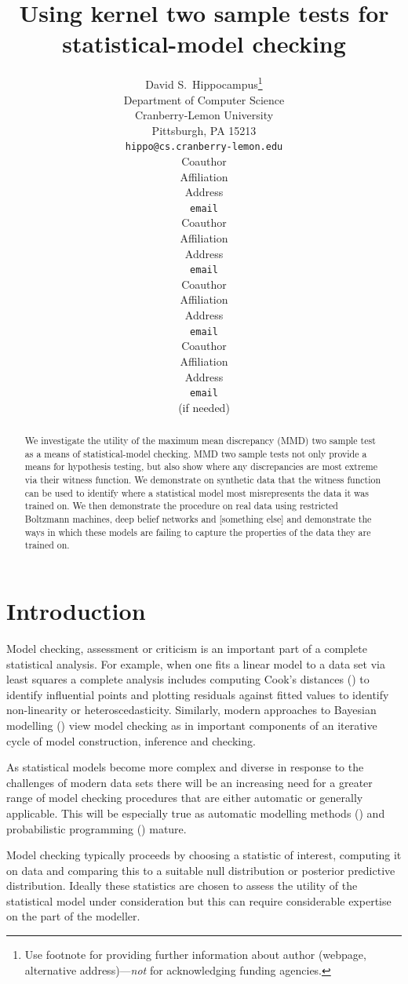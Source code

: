 \documentclass{article} %
\title{Using kernel two sample tests for\\statistical-model checking}
\author{
David S.~Hippocampus\thanks{ Use footnote for providing further information
about author (webpage, alternative address)---\emph{not} for acknowledging
funding agencies.} \\
Department of Computer Science\\
Cranberry-Lemon University\\
Pittsburgh, PA 15213 \\
\texttt{hippo@cs.cranberry-lemon.edu} \\
\And
Coauthor \\
Affiliation \\
Address \\
\texttt{email} \\
\AND
Coauthor \\
Affiliation \\
Address \\
\texttt{email} \\
\And
Coauthor \\
Affiliation \\
Address \\
\texttt{email} \\
\And
Coauthor \\
Affiliation \\
Address \\
\texttt{email} \\
(if needed)\\
}
\begin{document}
 

\maketitle

\begin{abstract} 
We investigate the utility of the maximum mean discrepancy (MMD) two sample test as a means of statistical-model checking.
MMD two sample tests not only provide a means for hypothesis testing, but also show where any discrepancies are most extreme via their witness function.
We demonstrate on synthetic data that the witness function can be used to identify where a statistical model most misrepresents the data it was trained on.
We then demonstrate the procedure on real data using restricted Boltzmann machines, deep belief networks and [something else] and demonstrate the ways in which these models are failing to capture the properties of the data they are trained on.
\end{abstract} 

\allowdisplaybreaks

\section{Introduction}

Model checking, assessment or criticism is an important part of a complete statistical analysis.
For example, when one fits a linear model to a data set via least squares a complete analysis includes computing Cook's distances () to identify influential points and plotting residuals against fitted values to identify non-linearity or heteroscedasticity.
Similarly, modern approaches to Bayesian modelling () view model checking as in important components of an iterative cycle of model construction, inference and checking.

As statistical models become more complex and diverse in response to the challenges of modern data sets there will be an increasing need for a greater range of model checking procedures that are either automatic or generally applicable.
This will be especially true as automatic modelling methods () and probabilistic programming () mature.

Model checking typically proceeds by choosing a statistic of interest, computing it on data and comparing this to a suitable null distribution or posterior predictive distribution.
Ideally these statistics are chosen to assess the utility of the statistical model under consideration but this can require considerable expertise on the part of the modeller.
\end{document}
